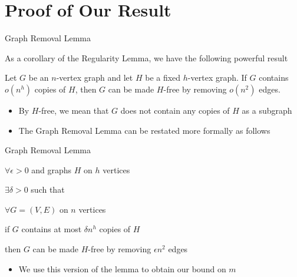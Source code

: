 \section{Proof of Our Result}
\begin{frame}{Graph Removal Lemma}

As a corollary of the Regularity Lemma, we have the following powerful result
{
\begin{lemma}
	Let $G$ be an $n$-vertex graph and let $H$ be a fixed $h$-vertex graph. If $G$ contains $o(n^h)$ copies of $H$, then $G$ can be made $H$-free by removing $o(n^2)$ edges.
\end{lemma}
}

\begin{itemize}
	\item<2-> By $H$-free, we mean that $G$ does not contain any copies of $H$ as a subgraph
	\item<3-> The Graph Removal Lemma can be restated more formally as follows
\end{itemize}

\end{frame}

\begin{frame}{Graph Removal Lemma}

{
\begin{lemma}
	$\forall \epsilon > 0$ and graphs $H$ on $h$ vertices
	\begin{description}[abc]
		\item<2->[$\bullet$] $\exists \delta > 0$ such that
		\begin{description}[abc]
			\item<3->[$\bullet$] $\forall G = (V,E)$ on $n$ vertices
			\begin{description}[abc]
				\item<4->[$\bullet$] if $G$ contains at most $\delta n^h$ copies of $H$
				\begin{description}[abc]
					\item<5->[$\bullet$] then $G$ can be made $H$-free by removing $\epsilon n^2$ edges
				\end{description}
			\end{description}
		\end{description}
	\end{description}
\end{lemma}
}

\begin{itemize}
	\item<6-> We use this version of the lemma to obtain our bound on $m$
\end{itemize}

\end{frame}

